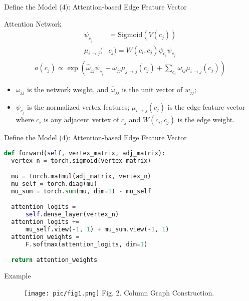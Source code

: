 \documentclass{beamer}
\begin{document}
\begin{frame}{Define the Model (4): Attention-based Edge Feature Vector}
    \begin{exampleblock}{Attention Network}
        \begin{align}
            \psi_{c_j} &= \mathrm{Sigmoid}(V(c_j))\\
            \mu_{i\to j}(&c_j) = W(c_i,c_j) \psi_{c_i}\psi_{c_j}
        \end{align}
        \begin{align}
            a(c_j) \propto \exp (\hat{\omega}_{jj}\psi_{c_j} + \omega_{jj}\mu_{j\to j}(c_j) + \sum_{c_i} \omega_{ij}\mu_{i\to j}(c_j))
        \end{align}
        \begin{itemize}
            \item ${\omega}_{jj}$ is the network weight, and $\hat{\omega}_{jj}$ is the unit vector of $w_{jj}$;
            \item $\psi_{c_j}$ is the normalized vertex features; $\mu_{i\to j}(c_j)$ is the edge feature vector where $c_i$ is any adjacent vertex of $c_j$ and $W(c_i, c_j)$ is the edge weight.
        \end{itemize}
    \end{exampleblock}
\end{frame}

\begin{frame}[fragile]{Define the Model (4): Attention-based Edge Feature Vector}
    \begin{minipage}{1.0\linewidth}
\begin{lstlisting}[language=Python]
def forward(self, vertex_matrix, adj_matrix):
  vertex_n = torch.sigmoid(vertex_matrix)

  mu = torch.matmul(adj_matrix, vertex_n)
  mu_self = torch.diag(mu)
  mu_sum = torch.sum(mu, dim=1) - mu_self

  attention_logits =
      self.dense_layer(vertex_n)
  attention_logits +=
      mu_self.view(-1, 1) + mu_sum.view(-1, 1)
  attention_weights =
      F.softmax(attention_logits, dim=1)

  return attention_weights
\end{lstlisting}
    \end{minipage}
\end{frame}

\begin{frame}{Example}
    \begin{figure}[htpb]
        \centering
        \texttt{[image: pic/fig1.png]}
        {Fig. 2. Column Graph Construction.}
    \end{figure}
\end{frame}
\end{document}
